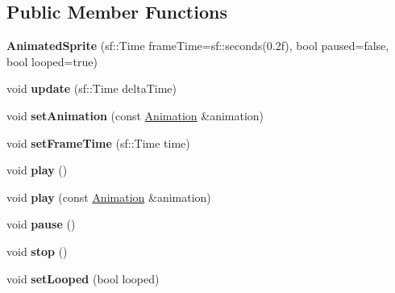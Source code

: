 \subsection*{Public Member Functions}
\begin{DoxyCompactItemize}
\item 
\mbox{\label{class_animated_sprite_a097ab8444824e7085d71a1f7144e7763}} 
{\bfseries Animated\+Sprite} (sf\+::\+Time frame\+Time=sf\+::seconds(0.\+2f), bool paused=false, bool looped=true)
\item 
\mbox{\label{class_animated_sprite_a17a41ff812631a9d8947d272933d6696}} 
void {\bfseries update} (sf\+::\+Time delta\+Time)
\item 
\mbox{\label{class_animated_sprite_ab1afc57d90d57a0c4bc4f5b090f2dacf}} 
void {\bfseries set\+Animation} (const \mbox{\hyperlink{class_animation}{Animation}} \&animation)
\item 
\mbox{\label{class_animated_sprite_af598fab5c3599ccc5ed1e2d4fefa68cc}} 
void {\bfseries set\+Frame\+Time} (sf\+::\+Time time)
\item 
\mbox{\label{class_animated_sprite_a203b968f1cb374cca5dbc89716174020}} 
void {\bfseries play} ()
\item 
\mbox{\label{class_animated_sprite_a9ea345649a4e012d096bc04aafe1ecb0}} 
void {\bfseries play} (const \mbox{\hyperlink{class_animation}{Animation}} \&animation)
\item 
\mbox{\label{class_animated_sprite_a48384db59427423b5c1d98f6ee94fe45}} 
void {\bfseries pause} ()
\item 
\mbox{\label{class_animated_sprite_af9734f4346d3d2370322b2dcaeef133c}} 
void {\bfseries stop} ()
\item 
\mbox{\label{class_animated_sprite_a855a5a48ea2e1c51c7c9304857dd2f8c}} 
void {\bfseries set\+Looped} (bool looped)
\item 
\mbox{\label{class_animated_sprite_a1a96a0f6570efddd2eb26f89bc5b6f50}} 

\end{DoxyCompactItemize}
